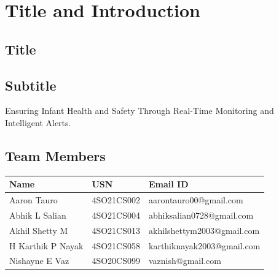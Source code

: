 \documentclass[12pt,a4paper]{report}
\begin{document}
\setlength{\textheight}{0.98\textheight} %
\setlength{\headheight}{30pt} %
\setlength{\footskip}{30pt} %
\fancyhf{} %
\fancyfoot[R]{\thepage} %
\renewcommand{\headrule}{%
  {\color[RGB]{0, 0, 0}\hrule width\headwidth height 2pt} %
  \vspace{0.07\baselineskip}%
  {\color[RGB]{0, 0, 0}\hrule width\headwidth height 0.5pt} %
}
\renewcommand{\footrule}{%

  {\color[RGB]{0,0,0}\hrule width\headwidth height 0.5pt} %
  \vspace{0.07\baselineskip}%
  {\color[RGB]{0,0,0}\hrule width\headwidth height 2pt} %
}


\renewcommand{\baselinestretch}{1.5}

\clearpage
\setcounter{page}{1}
\pagestyle{fancy}

\chapter{Title and Introduction}
\par
\section{Title}
\section{Subtitle}
Ensuring Infant Health and Safety Through Real-Time Monitoring and Intelligent Alerts.
\section{Team Members}
\begin{tabular}{|l|l|l|}
  \hline
  \textbf{Name}     & \textbf{USN} & \textbf{Email ID}          \\ \hline
  Aaron Tauro       & 4SO21CS002   & aarontauro00@gmail.com     \\ \hline
  Abhik L Salian    & 4SO21CS004   & abhiksalian0728@gmail.com  \\ \hline
  Akhil Shetty M    & 4SO21CS013   & akhilshettym2003@gmail.com \\ \hline
  H Karthik P Nayak & 4SO21CS058   & karthiknayak2003@gmail.com \\ \hline
  Nishayne E Vaz    & 4SO20CS099   & vaznish@gmail.com          \\ \hline
\end{tabular}
\end{document}
